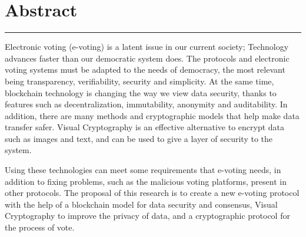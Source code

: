 \chapter*{Abstract}
\hrule \bigskip \vspace*{1cm}


Electronic voting (e-voting) is a latent issue in our current society; Technology advances faster than our democratic system does. The protocols and electronic voting systems must be adapted to the needs of democracy, the most relevant being transparency, verifiability, security and simplicity. At the same time, blockchain technology is changing the way we view data security, thanks to features such as decentralization, immutability, anonymity and auditability. In addition, there are many methods and cryptographic models that help make data transfer safer. 
Visual Cryptography is an effective alternative to encrypt data such as images and text, and can be used to give a layer of security to the system.

Using these technologies can meet some requirements that e-voting needs, in addition to fixing problems, such as the malicious voting platforms, present in other protocols. The proposal of this research is to create a new e-voting protocol with the help of a blockchain model for data security and consensus, Visual Cryptography to improve the privacy of data, and a cryptographic protocol for the process of vote.
